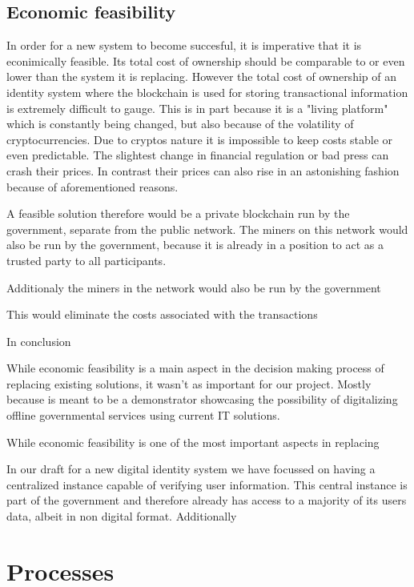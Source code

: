 \subsection{Economic feasibility}
\label{sec:economicFeasibility}
In order for a new system to become succesful, it is imperative that it is econimically feasible. Its total cost of ownership should be comparable to or even lower than the system it is replacing.
However the total cost of ownership of an identity system where the blockchain is used for storing transactional information is extremely difficult to gauge. This is in part because it is a "living platform" which is constantly being changed, but also because of the volatility of cryptocurrencies.
Due to cryptos nature it is impossible to keep costs stable or even predictable. The slightest change in financial regulation or bad press can crash their prices. In contrast their prices can also rise in an astonishing fashion because of aforementioned reasons. 

A feasible solution therefore would be a private blockchain run by the government, separate from the public network. The miners on this network would also be run by the government, because it is already in a position to act as a trusted party to all participants.

Additionaly the miners in the network would also be run by the government

This would eliminate the costs associated with the transactions

In conclusion 

While economic feasibility is a main aspect in the decision making process of replacing existing solutions, it wasn't as important for our project. Mostly because \projectName{} is meant to be a demonstrator showcasing the possibility of digitalizing offline governmental services using current IT solutions.

While economic feasibility is one of the most important aspects in replacing 

In our draft for a new digital identity system we have focussed on having a centralized instance capable of verifying user information. This central instance is part of the government and therefore already has access to a majority of its users data, albeit in non digital format.
Additionally 

\section{Processes}

